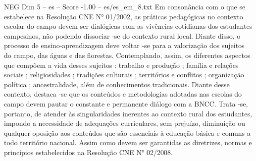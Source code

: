 \begin{textsample}{NEG Dim 5 – es – Score -1.00 – es/es\_em\_8.txt}
Em consonância com o que se estabelece na Resolução CNE N{\EmojiFont °} 01/2002, as práticas pedagógicas no contexto escolar do campo devem ser dialógicas com as vivências cotidianas dos estudantes campesinos, não podendo dissociar -se do contexto rural local.
Diante disso, o processo de ensino-aprendizagem deve voltar -se para a valorização dos sujeitos do campo, das águas e das florestas.
Contemplando, assim, os diferentes aspectos que compõem a vida desses sujeitos : trabalho e produção ; família e relações sociais ; religiosidades ; tradições culturais ; territórios e conflitos ; organização política ; ancestralidade, além de conhecimentos tradicionais.
Diante desse contexto, destaca -se que os conteúdos e metodologias adotadas nas escolas do campo devem pautar o constante e permanente diálogo com a BNCC.
Trata -se, portanto, de atender às singularidades inerentes ao contexto rural dos estudantes, impondo a necessidade de adequações curriculares, sem prejuízo, diminuição ou qualquer oposição aos conteúdos que são essenciais à educação básica e comuns a todo território nacional.
Assim como devem ser garantidas as diretrizes, normas e princípios estabelecidos na Resolução CNE N{\EmojiFont °} 02/2008.

\end{textsample}
